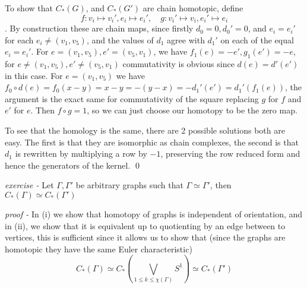 \documentclass[11pt]{article}
\theoremstyle{definition}
\begin{document}
    To show that \(C_*(G)\), and \(C_*(G')\) are chain homotopic, define \[f:v_i \mapsto v_i', e_i \mapsto e_i', \quad g: v_i' \mapsto v_i, e_i' \mapsto e_i\].
    By construction these are chain maps, since firstly \(d_0 = 0, d_0' = 0\), and \(e_i = e_i'\) for each \(e_i \neq (v_1,v_5)\), and the values of \(d_1\) agree with \(d_1'\) on each of the equal \(e_i = e_i'\). For \(e = (v_1,v_5), e' = (v_5,v_1)\), we have \(f_1(e) = -e',g_1(e')=-e\), for \(e \neq (v_1,v_5), e' \neq (v_5,v_1)\) commutativity is obvious since \(d(e) = d'(e')\) in this case. For \(e = (v_1,v_5)\) we have \(f_0 \circ d(e) = f_0(x-y) = x-y = -(y-x) = -d_1'(e') = d_1'(f_1(e))\), the argument is the exact same for commutativity of the square replacing \(g\) for \(f\) and \(e'\) for \(e\). Then \(f \circ g = 1\), so we can just choose our homotopy to be the zero map.

    To see that the homology is the same, there are 2 possible solutions both are easy. The first is that they are isomorphic as chain complexes, the second is that \(d_1\) is rewritten by multiplying a row by \(-1\), preserving the row reduced form and hence the generators of the kernel. \qed




    
    \emph{exercise - }\label{HEx4} Let \(\Gamma, \Gamma'\) be arbitrary graphs such that \(\Gamma \simeq \Gamma'\), then \(C_*(\Gamma) \simeq C_*(\Gamma')\)

    \emph{proof - } In (i) we show that homotopy of graphs is independent of orientation, and in (ii), we show that it is equivalent up to quotienting by an edge between to vertices, this is sufficient since it allows us to show that (since the graphs are homotopic they have the same Euler characteristic)
    \[C_*(\Gamma) \simeq C_*(\bigvee_{1 \leq k \leq \chi(\Gamma)} S^1) \simeq C_*(\Gamma')\]
\end{document}
